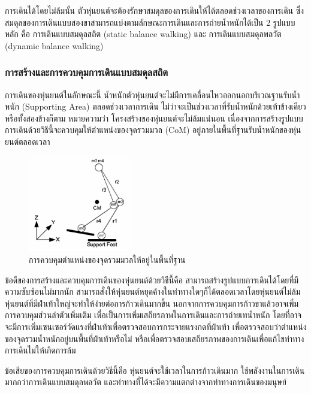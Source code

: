 การเดินได้โดยไม่ล้มนั้น ตัวหุ่นยนต์จะต้องรักษาสมดุลของการเดินให้ได้ตลอดช่วงเวลาของการเดิน
ซึ่งสมดุลของการเดินแบบสองขาสามารถแบ่งตามลักษณะการเดินและการถ่ายน้ำหนักได้เป็น 2 รูปแบบหลัก คือ 
การเดินแบบสมดุลสถิต (static balance walking) และ การเดินแบบสมดุลพลวัต (dynamic balance walking)

\subsubsection{การสร้างและการควบคุมการเดินแบบสมดุลสถิต}
การเดินของหุ่นยนต์ในลักษณะนี้ น้ำหนักตัวหุ่นยนต์จะไม่มีการเคลื่อนไหวออกนอกบริเวณฐานรับน้ำหนัก (Supporting Area)
ตลอดช่วงเวลาการเดิน ไม่ว่าจะเป็นช่วงเวลาที่รับน้ำหนักด้วยเท้าข้างเดียวหรือทั้งสองข้างก็ตาม หมายความว่า โครงสร้างของหุ่นยนต์จะไม่ล้มแน่นอน
เนื่องจากการสร้างรูปแบบการเดินด้วยวิธีนี้จะควบคุมให้ตำแหน่งของจุดรวมมวล (CoM) อยู่ภายในพื้นที่ฐานรับน้ำหนักของหุ่นยนต์ตลอดเวลา

\begin{figure}[ht]
	\centering
	\includegraphics[width=0.4\textwidth]{chapter2/images/cominsupportpolygon.png}
	\caption{การควบคุมตำแหน่งของจุดรวมมวลให้อยู่ในพื้นที่ฐาน}
	\label{fig:robot_com_support}
\end{figure}

ข้อดีของการสร้างและควบคุมการเดินของหุ่นยนต์ด้วยวิธีนี้คือ สามารถสร้างรูปแบบการเดินได้โดยที่มีความซับซ้อนไม่มากนัก
สามารถสั่งให้หุ่นยนต์หยุดค้างในท่าทางใดๆก็ได้ตลอดเวลาโดยหุ่นยนต์ไม่ล้ม หุ่นยนต์ที่มีฝ่าเท้าใหญ่จะทำให้ง่ายต่อการก้าวเดินมากขึ้น
นอกจากการควบคุมการก้าวขาแล้วอาจเพิ่มการควบคุมส่วนลำตัวเพิ่มเติม เพื่อเป็นการเพิ่มเสถียรภาพในการเดินและการถ่ายเทน้ำหนัก
โดยที่อาจจะมีการเพิ่มเซนเซอร์วัดแรงที่ฝ่าเท้าเพื่อตรวจสอบการกระจายแรงกดที่ฝ่าเท้า เพื่อตรวจสอบว่าตำแหน่งของจุดรวมน้ำหนักอยู่บนพื้นที่ฝ่าเท้าหรือไม่
หรือเพื่อตรวจสอบเสถียรภาพของการเดินเพื่อแก้ไขท่าทางการเดินไม่ให้เกิดการล้ม

ข้อเสียของการควบคุมการเดินด้วยวิธีนี้คือ หุ่นยนต์จะใช้เวลาในการก้าวเดินมาก ใช้พลังงานในการเดินมากกว่าการเดินแบบสมดุลพลวัต
และท่าทางที่ได้จะมีความแตกต่างจากท่าทางการเดินของมนุษย์

